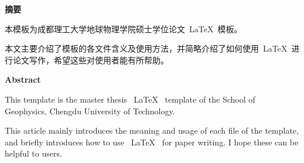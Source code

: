 \begin{cnabstract}
  \begin{center}
  \song {}  \textbf{摘要}
  \end{center}
  \vspace{18pt}
  \par
本模板为成都理工大学地球物理学院硕士学位论文~\LaTeX~模板。

本文主要介绍了模板的各文件含义及使用方法，并简略介绍了如何使用~\LaTeX~进行论文写作，希望这些对使用者能有所帮助。

\end{cnabstract}
\vspace{1em}\par


\begin{enabstract}
  \begin{center}
  \song {}  \bfseries {Abstract}
  \end{center}
  \vspace{18pt}
  \par
This template is the master thesis ~\LaTeX~ template of the School of Geophysics, Chengdu University of Technology.

This article mainly introduces the meaning and usage of each file of the template, and briefly introduces how to use ~\LaTeX~ for paper writing. I hope these can be helpful to users.

\end{enabstract}
\vspace{1em}\par



